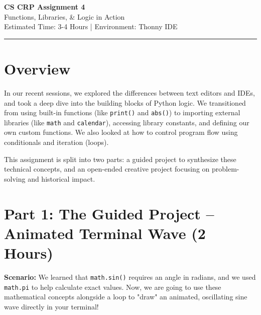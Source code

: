 \documentclass[11pt, a4paper]{article}
\begin{document}
\begin{center}
    {\LARGE \textbf{\textcolor{primaryblue}{CS CRP Assignment 4}}} \\[0.5em]
    {\Large Functions, Libraries, \& Logic in Action} \\[0.5em]
    {\small \color{darkgray} Estimated Time: 3-4 Hours \quad | \quad Environment: Thonny IDE}
\end{center}

\vspace{1em}
\hrule
\vspace{1.5em}

\section*{Overview}
In our recent sessions, we explored the differences between text editors and IDEs, and took a deep dive into the building blocks of Python logic. We transitioned from using built-in functions (like \texttt{print()} and \texttt{abs()}) to importing external libraries (like \texttt{math} and \texttt{calendar}), accessing library constants, and defining our own custom functions. We also looked at how to control program flow using conditionals and iteration (loops).

This assignment is split into two parts: a guided project to synthesize these technical concepts, and an open-ended creative project focusing on problem-solving and historical impact.

\vspace{1em}

\section*{Part 1: The Guided Project -- Animated Terminal Wave (2 Hours)}

\textbf{Scenario:} We learned that \texttt{math.sin()} requires an angle in radians, and we used \texttt{math.pi} to help calculate exact values. Now, we are going to use these mathematical concepts alongside a loop to "draw" an animated, oscillating sine wave directly in your terminal!
\end{document}
